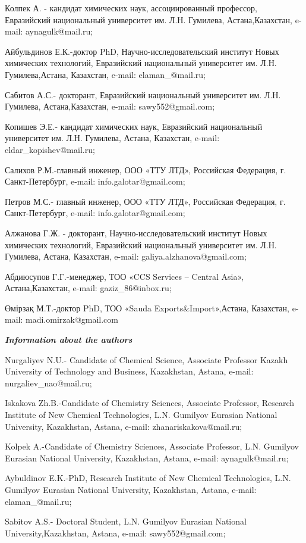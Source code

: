 Колпек А. - кандидат химических наук, ассоциированный профессор,
Евразийский национальный университет им. Л.Н. Гумилева,
Астана,Казахстан, e-mail: aynagulk@mail.ru;

Айбульдинов Е.К.-доктор PhD, Научно-исследовательский институт Новых
химических технологий, Евразийский национальный университет им. Л.Н.
Гумилева,Астана, Казахстан, e-mail: elaman\_@mail.ru;

Сабитов А.С.- докторант, Евразийский национальный университет им. Л.Н.
Гумилева, Астана,Казахстан, e-mail: sawy552@gmail.com;

Копишев Э.Е.- кандидат химических наук, Евразийский национальный
университет им. Л.Н. Гумилева, Астана, Казахстан, e-mail:
eldar\_kopishev@mail.ru;

Салихов Р.М.-главный инженер, ООО «ТТУ ЛТД», Российская Федерация, г.
Санкт-Петербург, e-mail: info.galotar@gmail.com;

Петров М.С.- главный инженер, ООО «ТТУ ЛТД», Российская Федерация, г.
Санкт-Петербург, e-mail: info.galotar@gmail.com;

Алжанова Г.Ж. - докторант, Научно-исследовательский институт Новых
химических технологий, Евразийский национальный университет им. Л.Н.
Гумилева, Астана, Казахстан, e-mail: galiya.alzhanova@gmail.com;

Абдиюсупов Г.Г.-менеджер, ТОО «CCS Services -- Central Asia»,
Астана,Казахстан, e-mail: gaziz\_86@inbox.ru;

Өмірзақ М.Т.-доктор PhD, ТОО «Sauda Exports\&Import»,Астана, Казахстан,
e-mail: madi.omirzak@gmail.com

\emph{\textbf{Information about the authors}}

Nurgaliyev N.U.- Candidate of Chemical Science, Associate Professor
Kazakh University of Technology and Business, Kazakhstan, Astana,
e-mail: nurgaliev\_nao@mail.ru;

Iskakova Zh.B.-Candidate of Chemistry Sciences, Associate Professor,
Research Institute of New Chemical Technologies, L.N. Gumilyov Eurasian
National University, Kazakhstan, Astana, e-mail: zhanariskakova@mail.ru;

Kolpek A.-Candidate of Chemistry Sciences, Associate Professor, L.N.
Gumilyov Eurasian National University, Kazakhstan, Astana, e-mail:
aynagulk@mail.ru;

Aybuldinov E.K.-PhD, Research Institute of New Chemical Technologies,
L.N. Gumilyov Eurasian National University, Kazakhstan, Astana, e-mail:
elaman\_@mail.ru;

Sabitov A.S.- Doctoral Student, L.N. Gumilyov Eurasian National
University,Kazakhstan, Astana, e-mail: sawy552@gmail.com;

